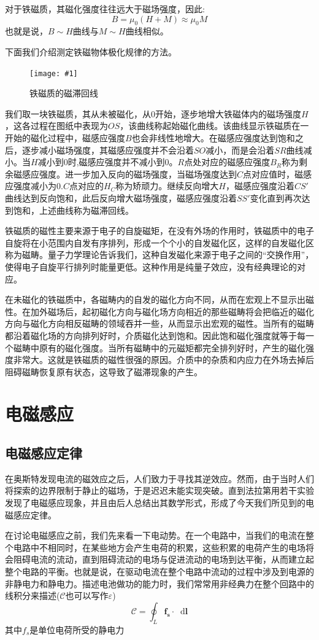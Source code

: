 \documentclass[12pt,a4paper,oneside]{report}
\theoremstyle{definition}
\theoremstyle{remark}
\newcommand{\insertfig}[3]{
    \begin{figure}[ht]
        \centering
        \texttt{[image: \#1]}
        \caption{#2}
        \label{fig:#1}
    \end{figure}
}
\renewcommand{\d}{\mathop{}\!\mathrm{d}}
\begin{document}
对于铁磁质，其磁化强度往往远大于磁场强度，因此:
\[
B = \mu_0(H+M) \approx \mu_0 M
\]
也就是说，$B\sim H$曲线与$M\sim H$曲线相似。

下面我们介绍测定铁磁物体极化规律的方法。
\insertfig{3-5.png}{铁磁质的磁滞回线}{0.3}

我们取一块铁磁质，其从未被磁化，从$0$开始，逐步地增大铁磁体内的磁场强度$H$，这各过程在图纸中表现为$OS$，该曲线称起始磁化曲线。该曲线显示铁磁质在一开始的磁化过程中，磁感应强度$B$也会非线性地增大。在磁感应强度达到饱和之后，逐步减小磁场强度，其磁感应强度并不会沿着$SO$减小，而是会沿着$SR$曲线减小。当$H$减小到$0$时,磁感应强度并不减小到$0$。$R$点处对应的磁感应强度$B_R$称为剩余磁感应强度。进一步加入反向的磁场强度，当磁场强度达到$C$点对应值时，磁感应强度减小为$0$.$C$点对应的$H_C$称为矫顽力。继续反向增大$H$，磁感应强度沿着$CS'$曲线达到反向饱和，此后反向增大磁场强度，磁感应强度沿着$SS'$变化直到再次达到饱和，上述曲线称为磁滞回线。

铁磁质的磁性主要来源于电子的自旋磁矩，在没有外场的作用时，铁磁质中的电子自旋将在小范围内自发有序排列，形成一个个小的自发磁化区，这样的自发磁化区称为磁畴。量子力学理论告诉我们，这种自发磁化来源于电子之间的“交换作用”，使得电子自旋平行排列时能量更低。这种作用是纯量子效应，没有经典理论的对应。

在未磁化的铁磁质中，各磁畴内的自发的磁化方向不同，从而在宏观上不显示出磁性。在加外磁场后，起初磁化方向与磁化场方向相近的那些磁畴将会把临近的磁化方向与磁化方向相反磁畴的领域吞并一些，从而显示出宏观的磁性。当所有的磁畴都沿着磁化场的方向排列好时，介质磁化达到饱和。因此饱和磁化强度就等于每一个磁畴中原有的磁化强度。当所有磁畴中的元磁矩都完全排列好时，产生的磁化强度非常大。这就是铁磁质的磁性很强的原因。介质中的杂质和内应力在外场去掉后阻碍磁畴恢复原有状态，这导致了磁滞现象的产生。

\chapter{电磁感应}
\section{电磁感应定律}
在奥斯特发现电流的磁效应之后，人们致力于寻找其逆效应。然而，由于当时人们将探索的边界限制于静止的磁场，于是迟迟未能实现突破。直到法拉第用若干实验发现了电磁感应现象，并且由后人总结出其数学形式，形成了今天我们所见到的电磁感应定律。

在讨论电磁感应之前，我们先来看一下电动势。在一个电路中，当我们的电流在整个电路中不相同时，在某些地方会产生电荷的积累，这些积累的电荷产生的电场将会阻碍电流的流动，直到阻碍流动的电场与促进流动的电场到达平衡，从而建立起整个电路的平衡。也就是说，在驱动电流在整个电路中流动的过程中涉及到电源的非静电力和静电力。描述电池做功的能力时，我们常常用非经典力在整个回路中的线积分来描述($\mathscr C$也可以写作$\varepsilon$)
\[
\mathscr C = \oint_L  \mathbf{f_s} \cdot \d \mathbf{l}
\]
其中$f_s$是单位电荷所受的静电力
\end{document}
